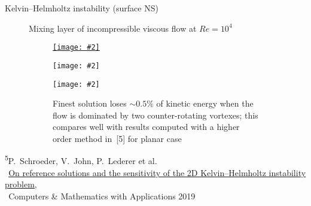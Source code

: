 \documentclass[svgnames]{beamer} %
\newcommand{\includegraphicsw}[2][1.]{\texttt{[image: \#2]}}
\begin{document}
	\begin{frame}{Kelvin--Helmholtz instability (surface NS)}
		\begin{figure}
			\small{Mixing layer of incompressible viscous flow at $Re = 10^4$}
			\begin{subfigure}{.5\linewidth}
				\centering
				\href{file:./img/KH.avi}{\includegraphicsw[.7]{kh_ini_u.png}}
			\end{subfigure}%
			\begin{subfigure}{.5\linewidth}
				\includegraphicsw[.9]{kh_kinetic_energy.pdf}
			\end{subfigure}
			\begin{subfigure}{.5\linewidth}
				\centering
				\includegraphicsw[.7]{KH_clouds_1.jpg}
			\end{subfigure}%
			\begin{subfigure}{.5\linewidth}
				\small{Finest solution loses ${\sim0.5\%}$ of kinetic energy when the flow is dominated by two counter-rotating vortexes; this compares well with results computed with a higher order method in~[5] for planar case}
			\end{subfigure}
		\end{figure}
		\vfill
		\setul{1pt}{.4pt} %
		\tiny{
			\textsuperscript{5}P.~Schroeder, V.~John, P.~Lederer et al.\\
			$\:\:$\href{https://www.sciencedirect.com/science/article/pii/S0898122118306278}{\ul{On reference solutions and the sensitivity of the 2D Kelvin--Helmholtz instability problem}},\\ $\:\:$Computers \& Mathematics with Applications 2019
		}
	\end{frame}

%	
\end{document}
